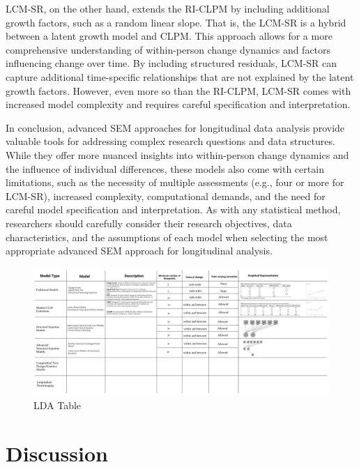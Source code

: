 \documentclass[
  number,
  preprint,
  3p,
  twocolumn]{elsarticle}
\begin{document}
LCM-SR, on the other hand, extends the RI-CLPM by including additional
growth factors, such as a random linear slope. That is, the LCM-SR is a
hybrid between a latent growth model and CLPM. This approach allows for
a more comprehensive understanding of within-person change dynamics and
factors influencing change over time. By including structured residuals,
LCM-SR can capture additional time-specific relationships that are not
explained by the latent growth factors. However, even more so than the
RI-CLPM, LCM-SR comes with increased model complexity and requires
careful specification and interpretation.

In conclusion, advanced SEM approaches for longitudinal data analysis
provide valuable tools for addressing complex research questions and
data structures. While they offer more nuanced insights into
within-person change dynamics and the influence of individual
differences, these models also come with certain limitations, such as
the necessity of multiple assessments (e.g., four or more for LCM-SR),
increased complexity, computational demands, and the need for careful
model specification and interpretation. As with any statistical method,
researchers should carefully consider their research objectives, data
characteristics, and the assumptions of each model when selecting the
most appropriate advanced SEM approach for longitudinal analysis.

\begin{figure}

{\centering \includegraphics{./figures/Tabletemp.png}

}

\caption{LDA Table}

\end{figure}

\hypertarget{discussion}{%
\section{Discussion}\label{discussion}}
\end{document}
